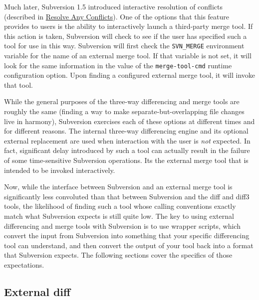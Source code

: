 Much later, Subversion 1.5 introduced interactive resolution of
conflicts (described in \hyperref[svn.tour.cycle.resolve]{Resolve Any
Conflicts}). One of the options that this feature provides to users is
the ability to interactively launch a third-party merge tool. If this
action is taken, Subversion will check to see if the user has specified
such a tool for use in this way. Subversion will first check the
\texttt{SVN\_MERGE} environment variable for the name of an external
merge tool. If that variable is not set, it will look for the same
information in the value of the \texttt{merge-tool-cmd} runtime
configuration option. Upon finding a configured external merge tool, it
will invoke that tool.

While the general purposes of the three-way differencing and merge tools
are roughly the same (finding a way to make separate-but-overlapping
file changes live in harmony), Subversion exercises each of these
options at different times and for different reasons. The internal
three-way differencing engine and its optional external replacement are
used when interaction with the user is \emph{not} expected. In fact,
significant delay introduced by such a tool can actually result in the
failure of some time-sensitive Subversion operations.
It\textquotesingle s the external merge tool that is intended to be
invoked interactively.

Now, while the interface between Subversion and an external merge tool
is significantly less convoluted than that between Subversion and the
diff and diff3 tools, the likelihood of finding such a tool whose
calling conventions exactly match what Subversion expects is still quite
low. The key to using external differencing and merge tools with
Subversion is to use wrapper scripts, which convert the input from
Subversion into something that your specific differencing tool can
understand, and then convert the output of your tool back into a format
that Subversion expects. The following sections cover the specifics of
those expectations.

\subsection{External diff}\label{svn.advanced.externaldifftools.diff}

